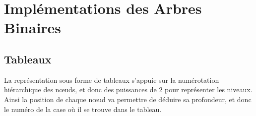 \documentclass[11pt,a4paper]{article}
\begin{document}
%


\clearpage

\section{Implémentations des Arbres Binaires}

\bigskip

\subsection{Tableaux}

La représentation sous forme de tableaux s'appuie sur la numérotation hiérarchique des nœuds, et donc des puissances de 2 pour représenter les niveaux.
Ainsi la position de chaque nœud va permettre de déduire sa profondeur, et donc le numéro de la case où il se trouve dans le tableau.
\end{document}
